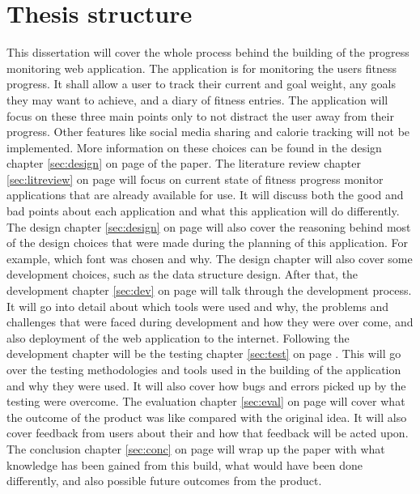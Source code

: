 \section{Thesis structure}
This dissertation will cover the whole process behind the building of the progress monitoring web application. The application is for monitoring the users fitness progress. It shall allow a user to track their current and goal weight, any goals they may want to achieve, and a diary of fitness entries. The application will focus on these three main points only to not distract the user away from their progress. Other features like social media sharing and calorie tracking will not be implemented. More information on these choices can be found in the design chapter \ref{sec:design} on page \pageref{sec:design} of the paper. The literature review chapter \ref{sec:litreview} on page \pageref{sec:litreview} will focus on current state of fitness progress monitor applications that are already available for use. It will discuss both the good and bad points about each application and what this application will do differently. The design chapter \ref{sec:design} on page \pageref{sec:design} will also cover the reasoning behind most of the design choices that were made during the planning of this application. For example, which font was chosen and why. The design chapter will also cover some development choices, such as the data structure design. After that, the development chapter \ref{sec:dev} on page \pageref{sec:dev} will talk through the development process. It will go into detail about which tools were used and why, the problems and challenges that were faced during development and how they were over come, and also deployment of the web application to the internet. Following the development chapter will be the testing chapter \ref{sec:test} on page \pageref{sec:test}. This will go over the testing methodologies and tools used in the building of the application and why they were used. It will also cover how bugs and errors picked up by the testing were overcome. The evaluation chapter \ref{sec:eval} on page \pageref{sec:eval} will cover what the outcome of the product was like compared with the original idea. It will also cover feedback from users about their and how that feedback will be acted upon. The conclusion chapter \ref{sec:conc} on page \pageref{sec:conc} will wrap up the paper with what knowledge has been gained from this build, what would have been done differently, and also possible future outcomes from the product.\\

